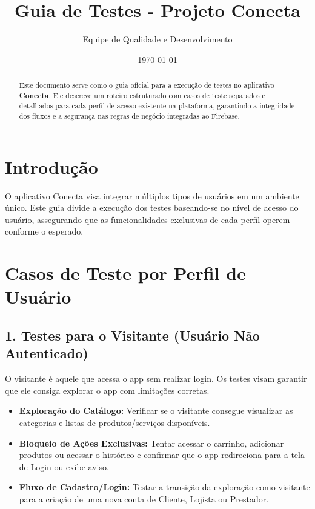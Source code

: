 \documentclass[a4paper,12pt]{article}
\title{\textbf{Guia de Testes - Projeto Conecta}}
\author{Equipe de Qualidade e Desenvolvimento}
\date{\today}
\begin{document}
\maketitle

\begin{abstract}
Este documento serve como o guia oficial para a execução de testes no aplicativo \textbf{Conecta}. Ele descreve um roteiro estruturado com casos de teste separados e detalhados para cada perfil de acesso existente na plataforma, garantindo a integridade dos fluxos e a segurança nas regras de negócio integradas ao Firebase.
\end{abstract}

\tableofcontents
\newpage

\section{Introdução}
O aplicativo Conecta visa integrar múltiplos tipos de usuários em um ambiente único. Este guia divide a execução dos testes baseando-se no nível de acesso do usuário, assegurando que as funcionalidades exclusivas de cada perfil operem conforme o esperado.

\section{Casos de Teste por Perfil de Usuário}

\subsection{1. Testes para o Visitante (Usuário Não Autenticado)}
O visitante é aquele que acessa o app sem realizar login. Os testes visam garantir que ele consiga explorar o app com limitações corretas.
\begin{itemize}
    \item \textbf{Exploração do Catálogo:} Verificar se o visitante consegue visualizar as categorias e listas de produtos/serviços disponíveis.
    \item \textbf{Bloqueio de Ações Exclusivas:} Tentar acessar o carrinho, adicionar produtos ou acessar o histórico e confirmar que o app redireciona para a tela de Login ou exibe aviso.
    \item \textbf{Fluxo de Cadastro/Login:} Testar a transição da exploração como visitante para a criação de uma nova conta de Cliente, Lojista ou Prestador.
\end{itemize}
\end{document}
